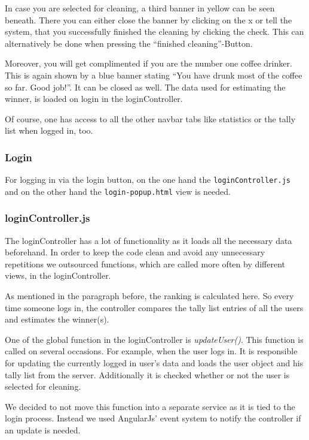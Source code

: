 In case you are selected for cleaning, a third banner in yellow can be
seen beneath. There you can either close the banner by clicking on the x
or tell the system, that you successfully finished the cleaning by
clicking the check. This can alternatively be done when pressing the
``finished cleaning''-Button.

Moreover, you will get complimented if you are the number one coffee
drinker. This is again shown by a blue banner stating ``You have drunk
most of the coffee so far. Good job!''. It can be closed as well. The
data used for estimating the winner, is loaded on login in the
loginController.

Of course, one has access to all the other navbar tabs like statistics
or the tally list when logged in, too.

\subsubsection{Login}\label{login}

For logging in via the login button, on the one hand the
\texttt{loginController.js} and on the other hand the
\texttt{login-popup.html} view is needed.

\subsubsection*{loginController.js}

The loginController has a lot of functionality as it loads all the
necessary data beforehand. In order to keep the code clean and avoid any
unnecessary repetitions we outsourced functions, which are called more
often by different views, in the loginController.

As mentioned in the paragraph before, the ranking is calculated here. So
every time someone logs in, the controller compares the tally list
entries of all the users and estimates the winner(s).

One of the global function in the loginController is
\emph{updateUser()}. This function is called on several occasions. For
example, when the user logs in. It is responsible for updating the
currently logged in user's data and loads the user object and his tally
list from the server. Additionally it is checked whether or not the user
is selected for cleaning.

We decided to not move this function into a separate service as it is
tied to the login process. Instead we used AngularJs' event system to
notify the controller if an update is needed.

